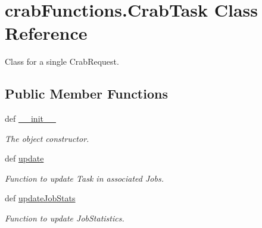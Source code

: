 \section{crab\-Functions.\-Crab\-Task Class Reference}
\label{classcrabFunctions_1_1CrabTask}


Class for a single Crab\-Request.  


\subsection*{Public Member Functions}
\begin{DoxyCompactItemize}
\item 
def \hyperlink{classcrabFunctions_1_1CrabTask_aef5968057e988666f6614eefc2e1dd79}{\-\_\-\-\_\-init\-\_\-\-\_\-}
\begin{DoxyCompactList}\small\item\em The object constructor. \end{DoxyCompactList}\item 
def \hyperlink{classcrabFunctions_1_1CrabTask_a8892a90d9bfa0914ec82668386d01547}{update}
\begin{DoxyCompactList}\small\item\em Function to update Task in associated Jobs. \end{DoxyCompactList}\item 
def \hyperlink{classcrabFunctions_1_1CrabTask_ada8f4221987d8cb4f48843e4f46fbee6}{update\-Job\-Stats}
\begin{DoxyCompactList}\small\item\em Function to update Job\-Statistics. \end{DoxyCompactList}\end{DoxyCompactItemize}
